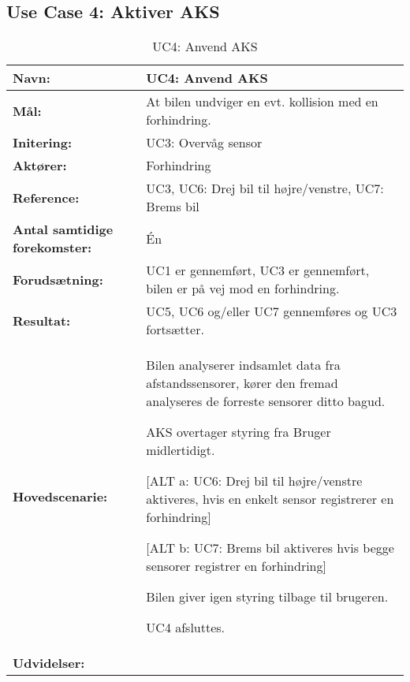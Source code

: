 \subsection{Use Case 4: Aktiver AKS}
\begin{table}[h]
\begin{tabularx}{\textwidth}{| L{3.3 cm} | Z |} \hline

\textbf{Navn:} 						& UC4: Anvend AKS											\\ \hline
\textbf{Mål:}						& At bilen undviger en evt. kollision med en forhindring.	\\ \hline
\textbf{Initering:}					& UC3: Overvåg sensor 										\\ \hline
\textbf{Aktører:} 					& Forhindring 												\\ \hline
\textbf{Reference:} 				& UC3, UC6: Drej bil til højre/venstre, UC7: Brems bil 		\\ \hline
\textbf{Antal samtidige forekomster:} & Én 														\\ \hline
\textbf{Forudsætning:} 				& UC1 er gennemført, UC3 er gennemført, 
									  bilen er på vej mod en forhindring. 						\\ \hline
\textbf{Resultat:}					& UC5, UC6 og/eller UC7 gennemføres og UC3 fortsætter. 		\\ \hline
\textbf{Hovedscenarie:}				& 

\begin{packed_enum}
	\item Bilen analyserer indsamlet data fra afstandssensorer, kører den fremad analyseres de forreste sensorer ditto bagud.
	\item AKS overtager styring fra Bruger midlertidigt.
	\item 
		\begin{packed_item}\itemsep1pt \parskip0pt 
			\item {[}ALT a: UC6: Drej bil til højre/venstre aktiveres, hvis en enkelt sensor registrerer en forhindring{]}
			\item {[}ALT b: UC7: Brems bil aktiveres hvis begge sensorer registrer en forhindring{]}
		\end{packed_item}
	\item Bilen giver igen styring tilbage til brugeren.
	\item UC4 afsluttes.
\end{packed_enum} 																				\\ \hline
	\textbf{Udvidelser:}				&   													\\ \hline
\end{tabularx}
\caption{UC4: Anvend AKS}
\label{tbl:UC4}
\end{table}